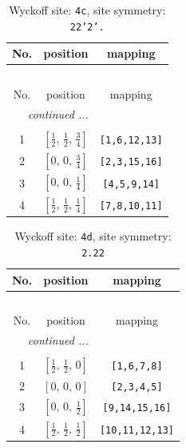 \documentclass[fleqn,8pt]{jsarticle}
\begin{document}
\renewcommand{\arraystretch}{1.2}
\begin{longtable}{ccc}
\caption{Wyckoff site: {\tt 4c}, site symmetry: {\tt 22'2'.}}
 \\
 \hline \hline
No. & position & mapping \\ \hline \endfirsthead

\multicolumn{2}{l}{\tablename\ \thetable{}} \\
 \hline \hline
No. & position & mapping \\ \hline \endhead

 \hline \hline
\multicolumn{2}{r}{\footnotesize\it continued ...} \\ \endfoot

 \hline \hline
\multicolumn{2}{r}{} \\ \endlastfoot

1 & $\left[ \frac{1}{2},\, \frac{1}{2},\, \frac{3}{4} \right]$ & {\tt [1,6,12,13]} \\ \hline
2 & $\left[ 0,\, 0,\, \frac{3}{4} \right]$ & {\tt [2,3,15,16]} \\ \hline
3 & $\left[ 0,\, 0,\, \frac{1}{4} \right]$ & {\tt [4,5,9,14]} \\ \hline
4 & $\left[ \frac{1}{2},\, \frac{1}{2},\, \frac{1}{4} \right]$ & {\tt [7,8,10,11]} \\
\end{longtable}
\renewcommand{\arraystretch}{1.2}
\begin{longtable}{ccc}
\caption{Wyckoff site: {\tt 4d}, site symmetry: {\tt 2.22}}
 \\
 \hline \hline
No. & position & mapping \\ \hline \endfirsthead

\multicolumn{2}{l}{\tablename\ \thetable{}} \\
 \hline \hline
No. & position & mapping \\ \hline \endhead

 \hline \hline
\multicolumn{2}{r}{\footnotesize\it continued ...} \\ \endfoot

 \hline \hline
\multicolumn{2}{r}{} \\ \endlastfoot

1 & $\left[ \frac{1}{2},\, \frac{1}{2},\, 0 \right]$ & {\tt [1,6,7,8]} \\ \hline
2 & $\left[ 0,\, 0,\, 0 \right]$ & {\tt [2,3,4,5]} \\ \hline
3 & $\left[ 0,\, 0,\, \frac{1}{2} \right]$ & {\tt [9,14,15,16]} \\ \hline
4 & $\left[ \frac{1}{2},\, \frac{1}{2},\, \frac{1}{2} \right]$ & {\tt [10,11,12,13]} \\
\end{longtable}
\end{document}
